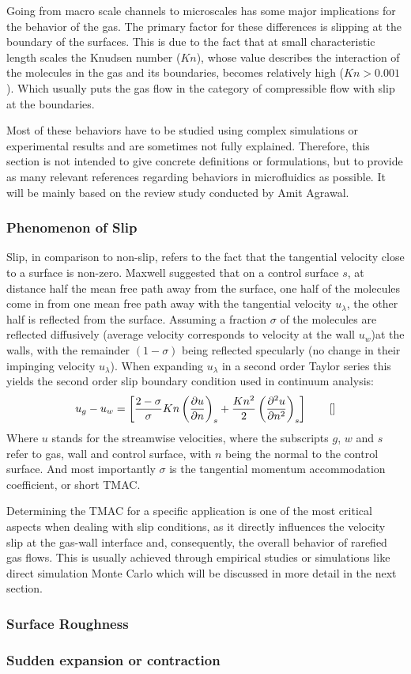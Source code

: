 	Going from macro scale channels to microscales has some major implications for the behavior of the gas.
	The primary factor for these differences is slipping at the boundary of the surfaces.
	This is due to the fact that at small characteristic length scales the Knudsen number ($Kn$), whose value describes the interaction of the molecules in the gas and its boundaries, becomes relatively high ($Kn > 0.001$).
	Which usually puts the gas flow in the category of compressible flow with slip at the boundaries.

	Most of these behaviors have to be studied using complex simulations or experimental results and are sometimes not fully explained.
	Therefore, this section is not intended to give concrete definitions or formulations, but to provide as many relevant references regarding behaviors in microfluidics as possible.
	It will be mainly based on the review study conducted by Amit Agrawal.
	\cite{agrawal_comprehensive_2011}

\subsubsection*{Phenomenon of Slip}
	Slip, in comparison to non-slip, refers to the fact that the tangential velocity close to a surface is non-zero.
	Maxwell suggested that on a control surface $s$, at distance half the mean free path away from the surface, one half of the molecules come in from one mean free path away with the tangential velocity $u_\lambda$, the other half is reflected from the surface.
	Assuming a fraction $\sigma$ of the molecules are reflected diffusively (average velocity corresponds to velocity at the wall $u_w$)at the walls, with the remainder $(1-\sigma)$ being reflected specularly (no change in their impinging velocity $u_\lambda$).
	When expanding $u_\lambda$ in a second order Taylor series this yields the second order slip boundary condition used in continuum analysis:
	$$
		u_g - u_w =
		\left[
			\frac{2-\sigma}{\sigma}Kn\left(\frac{\partial u}{\partial n}\right)_s
			+ \frac{Kn^2}{2} \left(\frac{\partial^2 u}{\partial n^2}\right)_s
		\right]
		\qquad \eqref{}
	$$ 
	Where $u$ stands for the streamwise velocities, where the subscripts $g$, $w$ and $s$ refer to gas, wall and control surface, with $n$ being the normal to the control surface.
	And most importantly $\sigma$ is the tangential momentum accommodation coefficient, or short TMAC.

	Determining the TMAC for a specific application is one of the most critical aspects when dealing with slip conditions, as it directly influences the velocity slip at the gas-wall interface and, consequently, the overall behavior of rarefied gas flows.
	This is usually achieved through empirical studies or simulations like direct simulation Monte Carlo which will be discussed in more detail in the next section.

\subsubsection*{Surface Roughness}

\subsubsection*{Sudden expansion or contraction}

